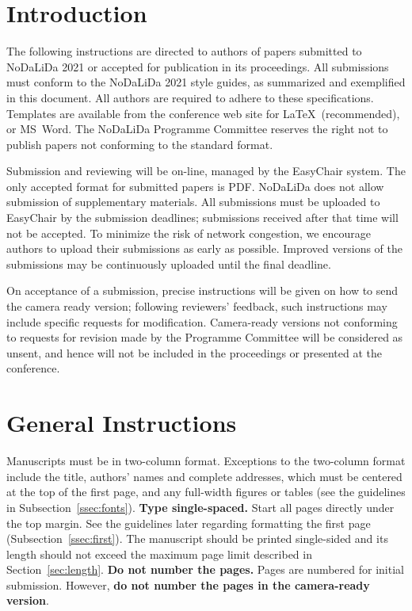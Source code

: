 \documentclass[11pt]{article}
\begin{document}
\section{Introduction}

The following instructions are directed to authors of papers submitted
to NoDaLiDa 2021 or accepted for publication in its proceedings. 
All submissions must conform to the NoDaLiDa 2021 style guides, as summarized
and exemplified in this document. All authors are required to adhere to these specifications. 
Templates are available from the conference web site for \LaTeX\
(recommended), or MS~Word. The NoDaLiDa Programme Committee reserves
the right not to publish papers not conforming to the standard format. 

Submission and reviewing will be on-line, managed by the EasyChair system.
The only accepted format for submitted papers is PDF.
NoDaLiDa does not allow submission of supplementary materials.
All submissions must be uploaded to EasyChair by the submission deadlines;
submissions received after that time will not be accepted.
To minimize the risk of network congestion, we encourage authors to upload
their submissions as early as possible. 
Improved versions of the submissions may be continuously uploaded until the
final deadline. 

On acceptance of a submission, precise instructions will be given on how to
send the camera ready version; following reviewers' feedback, such instructions
may include specific requests for modification.
Camera-ready versions not conforming to requests for revision made by the
Programme Committee will be considered as unsent, and hence will not be
included in the proceedings or presented at the conference.

\section{General Instructions}

Manuscripts must be in two-column format.  Exceptions to the
two-column format include the title, authors' names and complete
addresses, which must be centered at the top of the first page, and
any full-width figures or tables (see the guidelines in
Subsection~\ref{ssec:fonts}). {\bf Type single-spaced.}  Start all
pages directly under the top margin. See the guidelines later
regarding formatting the first page (Subsection~\ref{ssec:first}).
The manuscript should be printed single-sided and its length should
not exceed the maximum page limit described in
Section~\ref{sec:length}.  {\bf Do not number the pages.}
Pages are numbered for  initial submission. However, {\bf do not number the pages in the camera-ready version}.
\end{document}
